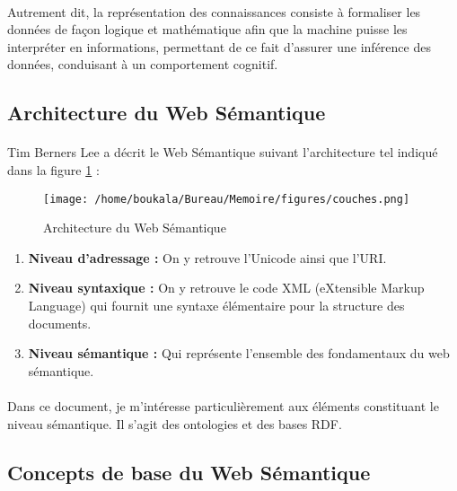 \documentclass[12pt, a4paper, oneside]{book}
\begin{document}
\paragraph{}
Autrement dit, la représentation des connaissances consiste à formaliser les données de façon logique et mathématique afin que la machine puisse les interpréter en informations, permettant de ce fait d'assurer une inférence des données, conduisant à un comportement cognitif.


\subsection{Architecture du Web Sémantique}
\paragraph{}
Tim Berners Lee a décrit le Web Sémantique suivant l'architecture tel indiqué dans la figure \ref{couches} :  

\begin{figure}[h!]
\begin{center}
\texttt{[image: /home/boukala/Bureau/Memoire/figures/couches.png]}
\caption{Architecture du Web Sémantique}
\label{couches}
\end{center}
\end{figure}


\begin{enumerate}

\item \textbf{Niveau d'adressage : } On y retrouve l'Unicode ainsi que l'URI.

\item \textbf{Niveau syntaxique : } On y retrouve le code XML (eXtensible Markup Language) qui fournit une syntaxe élémentaire pour la structure des documents.

\item \textbf{Niveau sémantique : } Qui représente l'ensemble des fondamentaux du web sémantique.

\end{enumerate}

\paragraph{}
Dans ce document, je m'intéresse particulièrement aux éléments constituant le niveau sémantique. Il s'agit des ontologies et des bases RDF.


\subsection{Concepts de base du Web Sémantique}
\end{document}
